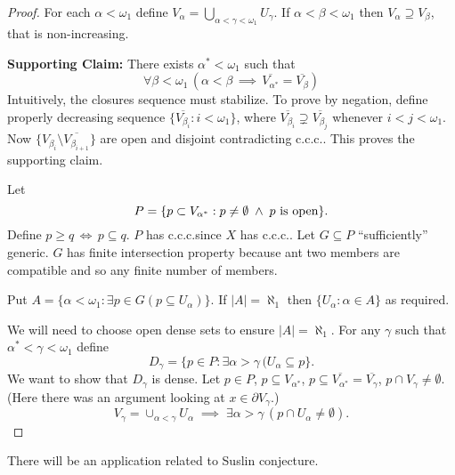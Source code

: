 \documentclass[11pt,pdftex,twoside,a4paper]{article}
\newcommand{\B}[1]{\textbf{#1}}
\newcommand{\ccc}{c.c.c.}
\theoremstyle{definition}
\begin{document}
\begin{proof}
For each \(\alpha <\omega_1\) define 
\(V_\alpha = \bigcup_{\alpha<\gamma<\omega_1} U_\gamma\).
If \(\alpha<\beta<\omega_1\) then \(V_\alpha \supseteq V_\beta\),
that is non-increasing.

\B{Supporting Claim:} There exists \(\alpha^* <\omega_1\) 
such that 
\begin{equation*}
\forall \beta<\omega_1\,\left(\alpha<\beta\,\implies\, 
 \overline{V_{\alpha^*}} = \overline{V_\beta}\right)
\end{equation*}
Intuitively, the closures sequence must stabilize.
To prove by negation, define properly decreasing sequence
\(\{\overline{V_{\beta_i}}: i < \omega_1\}\), 
where \(\overline{V_{\beta_i}} \supsetneq \overline{V_{\beta_j}}\)
whenever \(i<j<\omega_1\). 
Now \(\{V_{\beta_i} \setminus \overline{V_{\beta_{i+1}}}\}\)
are open and disjoint contradicting \ccc.
This proves the supporting claim.

Let
\begin{equation*}
P = \{p \subset V_{\alpha^*}: p\neq\emptyset\;\land\; p\textnormal{ is open}\}.
\end{equation*}
Define \(p\geq q\,\iff\, p\subseteq q\).
$P$ has \ccc since $X$ has \ccc.
Let \(G\subseteq P\) ``sufficiently'' generic.
$G$ has finite intersection property because
ant two members are compatible and so any finite number of members.

Put \(A=\{\alpha<\omega_1: \exists p\in G (p\subseteq U_\alpha)\}\).
If \(|A|=\aleph_1\) then \(\{U_\alpha: \alpha\in A\}\) as required.

We will need to choose open dense sets to ensure \(|A|=\aleph_1\).
For any \(\gamma\) such that \(\alpha^*<\gamma<\omega_1\) define 
\begin{equation*}
D_\gamma = \{p\in P: \exists \alpha>\gamma\,(U_\alpha \subseteq p\}.
\end{equation*}
We want to show that \(D_\gamma\) is dense.
Let \(p\in P\), \(p\subseteq V_{\alpha^*}\), 
\(p\subseteq \overline{V_{\alpha^*}} = \overline{V_\gamma}\),
\(p \cap V_\gamma \neq \emptyset\).
(Here there was an argument looking at \(x\in \partial V_\gamma\).)
\begin{equation*}
V_\gamma = \cup_{\alpha<\gamma} U_\alpha\;\implies\;
 \exists \alpha>\gamma\,(p\cap U_\alpha \neq \emptyset).
\end{equation*}
\end{proof}

There will be an application related to Suslin conjecture.
\end{document}
